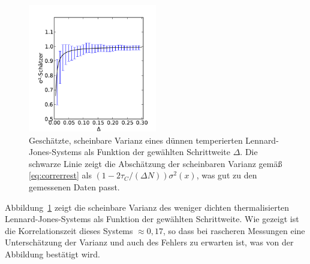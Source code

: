 \begin{figure}
  \centering
  \includegraphics[width=0.5\textwidth]{plots/error}
  \caption{Geschätzte, scheinbare Varianz eines dünnen temperierten
    Lennard-Jones-Systems als Funktion der gewählten Schrittweite
    $\Delta$.  Die schwarze Linie zeigt die Abschätzung der
    scheinbaren Varianz gemäß \eqref{eq:correrrest} als
    $(1-2\tau_C/(\Delta N))\sigma^2(x)$, was gut zu den gemessenen
    Daten passt.}
  \label{fig:error}
\end{figure}

Abbildung~\ref{fig:error} zeigt die scheinbare Varianz des weniger
dichten thermalisierten Lennard-Jones-Systems als Funktion der
gewählten Schrittweite. Wie gezeigt ist die Korrelationszeit dieses
Systems $\approx 0,17$, so dass bei rascheren Messungen eine
Unterschätzung der Varianz und auch des Fehlers zu erwarten ist, was
von der Abbildung bestätigt wird.

